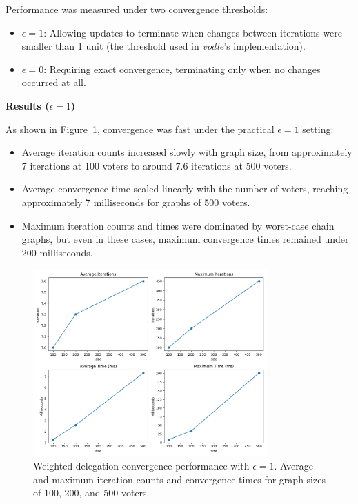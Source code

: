 Performance was measured under two convergence thresholds:
\begin{itemize}
    \item \textbf{$\epsilon = 1$}: Allowing updates to terminate when changes between iterations were smaller than 1 unit (the threshold used in \textit{vodle}'s implementation).
    \item \textbf{$\epsilon = 0$}: Requiring exact convergence, terminating only when no changes occurred at all.
\end{itemize}

\textbf{Results ($\epsilon = 1$)}  

As shown in Figure~\ref{fig:e1_perf}, convergence was fast under the practical $\epsilon = 1$ setting:
\begin{itemize}
    \item Average iteration counts increased slowly with graph size, from approximately 7 iterations at 100 voters to around 7.6 iterations at 500 voters.
    \item Average convergence time scaled linearly with the number of voters, reaching approximately 7 milliseconds for graphs of 500 voters.
    \item Maximum iteration counts and times were dominated by worst-case chain graphs, but even in these cases, maximum convergence times remained under 200 milliseconds.
\end{itemize}

\begin{figure}[H]
    \centering
    \includegraphics[width=0.8\textwidth]{../common/perf_graphs/e_1.png}
    \caption{Weighted delegation convergence performance with $\epsilon = 1$. Average and maximum iteration counts and convergence times for graph sizes of 100, 200, and 500 voters.}
    \label{fig:e1_perf}
\end{figure}

